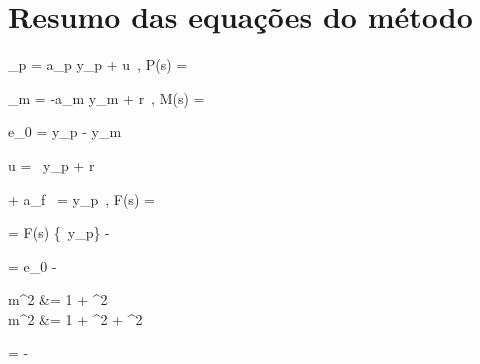 ﻿%
\section{Resumo das equações do método}


\vspace{20mm}

\noindent

  {_p = a_p y_p + u \,, \quad P(s) =  \label{eq:planta}}

  {_m = -a_m y_m + r \,, \quad M(s) =  \label{eq:ref_model}}

  {e_0 = y_p - y_m \label{eq:error}}

  {u = \theta \, y_p + r \label{eq:ctrl_law}}

  {\dot{\zeta} + a_f \, \zeta = y_p \,, \quad F(s) =  \label{eq:filter}}

  { = F(s) \odot \{\theta \, y_p\} - \theta\zeta \label{eq:est_error}}

  {\varepsilon = e_0 -  \label{eq:error_est}}

  {m^2 &= 1 + \zeta^2 \\ m^2 &= 1 + \zeta^2 + \dot{\zeta}^2 \label{eq:norm_signal}}

  {\dot{\theta} = -  \label{eq:adpt_law}}


